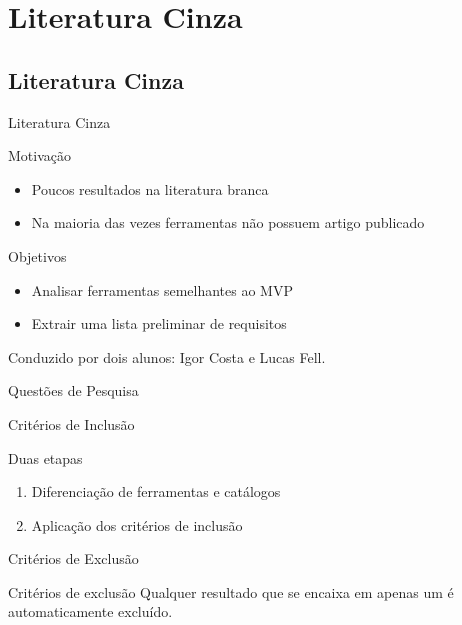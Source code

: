 \section{Literatura Cinza}
\subsection*{Literatura Cinza}

\begin{frame}{{\sffamily Literatura Cinza}}
  \begin{block}{Motivação}
    \begin{itemize}
      \item Poucos resultados na literatura branca
      \item Na maioria das vezes ferramentas não possuem artigo publicado
    \end{itemize}
  \end{block}

  \begin{block}{Objetivos}
    \begin{itemize}
      \item Analisar ferramentas semelhantes ao MVP
      \item Extrair uma lista preliminar de requisitos
    \end{itemize}
  \end{block}
  Conduzido por dois alunos: Igor Costa e Lucas Fell.
\end{frame}

\begin{frame}{{\sffamily Questões de Pesquisa}}
  
\end{frame}

\begin{frame}{{\sffamily Critérios de Inclusão}}
  \begin{block}{Duas etapas}
    \begin{enumerate}
      \item Diferenciação de ferramentas e catálogos
      \item Aplicação dos critérios de inclusão
    \end{enumerate}
  \end{block}
  
\end{frame}

\begin{frame}{{\sffamily Critérios de Exclusão}}
  \begin{block}{Critérios de exclusão}
    Qualquer resultado que se encaixa em apenas um é automaticamente excluído.
  \end{block}
  
\end{frame}


